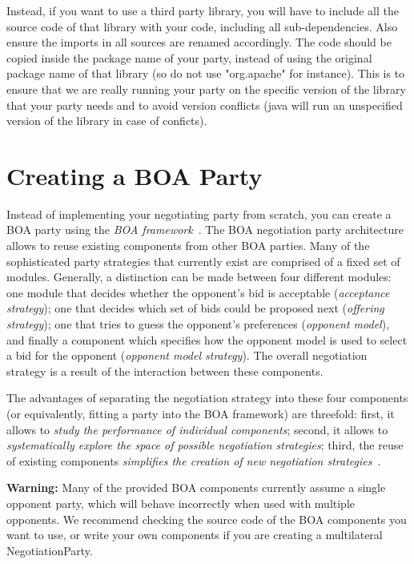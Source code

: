 \documentclass[]{article}
\begin{document}
Instead, if you want to use a third party library, you will have to include all the source code of that library with your code, including all sub-dependencies. Also ensure the imports in all sources are renamed accordingly. The code should be copied inside the package name of your party, instead of using the original package name of that library (so do not use "org.apache" for instance). This is to ensure that we are really running your party on the specific version of the library that your party needs and to avoid version conflicts (java will run an unspecified version of the library in case of conficts). 


\section{Creating a BOA Party}\label{sec:boa}
Instead of implementing your negotiating party from scratch, you can create a BOA party using the \textit{BOA framework}~\cite{BaarslagBOA}.
The BOA negotiation party architecture allows to reuse existing components from other BOA parties. Many of the sophisticated party strategies that currently exist are comprised of a fixed set of modules. Generally, a distinction can be made between four different modules: one module that decides whether the opponent's bid is acceptable (\textit{acceptance strategy}); one that decides which set of bids could be proposed next (\textit{offering strategy}); one that tries to guess the opponent's preferences (\textit{opponent model}), and finally a component which specifies how the opponent model is used to select a bid for the opponent (\textit{opponent model strategy}). The overall negotiation strategy is a result of the interaction between these components.

The advantages of separating the negotiation strategy into these four components (or equivalently, fitting a party into the BOA framework) are threefold: first, it allows to \textit{study the performance of individual components}; second, it allows to \textit{systematically explore the space of possible negotiation strategies}; third, the reuse of existing components \textit{simplifies the creation of new negotiation strategies}~\cite{BaarslagComponentAnalysis}.

{\bf Warning:} Many of the provided BOA components currently assume a single opponent party, which will behave incorrectly when used with multiple opponents. We recommend checking the source code of the BOA components you want to use, or write your own components if you are creating a multilateral NegotiationParty.
\end{document}
